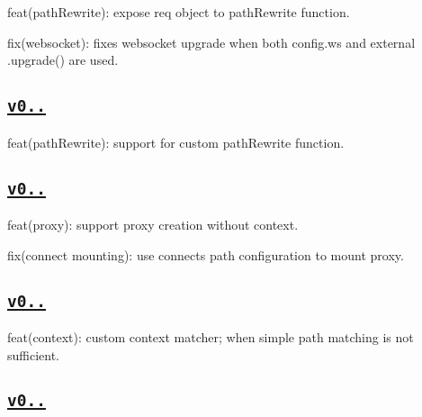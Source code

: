 \begin{DoxyItemize}
\item feat(path\+Rewrite)\+: expose {\ttfamily req} object to path\+Rewrite function.
\item fix(websocket)\+: fixes websocket upgrade when both config.\+ws and external .upgrade() are used.
\end{DoxyItemize}

\subsection*{\href{https://github.com/chimurai/http-proxy-middleware/releases/tag/v0.15.0}{\tt v0..}}


\begin{DoxyItemize}
\item feat(path\+Rewrite)\+: support for custom path\+Rewrite function.
\end{DoxyItemize}

\subsection*{\href{https://github.com/chimurai/http-proxy-middleware/releases/tag/v0.14.0}{\tt v0..}}


\begin{DoxyItemize}
\item feat(proxy)\+: support proxy creation without context.
\item fix(connect mounting)\+: use connect\textquotesingle{}s {\ttfamily path} configuration to mount proxy.
\end{DoxyItemize}

\subsection*{\href{https://github.com/chimurai/http-proxy-middleware/releases/tag/v0.13.0}{\tt v0..}}


\begin{DoxyItemize}
\item feat(context)\+: custom context matcher; when simple {\ttfamily path} matching is not sufficient.
\end{DoxyItemize}

\subsection*{\href{https://github.com/chimurai/http-proxy-middleware/releases/tag/v0.12.0}{\tt v0..}}


